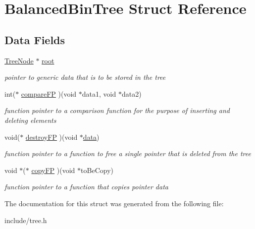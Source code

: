 \hypertarget{struct_balanced_bin_tree}{}\section{Balanced\+Bin\+Tree Struct Reference}
\label{struct_balanced_bin_tree}
\subsection*{Data Fields}
\begin{DoxyCompactItemize}
\item 
\mbox{\label{struct_balanced_bin_tree_a674753c8a07be3804c510c5a2a6e4aa6}} 
\hyperlink{struct_balanced_bin_tree_node}{Tree\+Node} $\ast$ \hyperlink{struct_balanced_bin_tree_a674753c8a07be3804c510c5a2a6e4aa6}{root}
\begin{DoxyCompactList}\small\item\em pointer to generic data that is to be stored in the tree \end{DoxyCompactList}\item 
\mbox{\label{struct_balanced_bin_tree_a37dfa16f7cf2e5877b3270c7274b40d0}} 
int($\ast$ \hyperlink{struct_balanced_bin_tree_a37dfa16f7cf2e5877b3270c7274b40d0}{compare\+FP} )(void $\ast$data1, void $\ast$data2)
\begin{DoxyCompactList}\small\item\em function pointer to a comparison function for the purpose of inserting and deleting elements \end{DoxyCompactList}\item 
\mbox{\label{struct_balanced_bin_tree_a39c48eca2f84ba1988b6bf44bee50fbf}} 
void($\ast$ \hyperlink{struct_balanced_bin_tree_a39c48eca2f84ba1988b6bf44bee50fbf}{destroy\+FP} )(void $\ast$\hyperlink{structdata}{data})
\begin{DoxyCompactList}\small\item\em function pointer to a function to free a single pointer that is deleted from the tree \end{DoxyCompactList}\item 
\mbox{\label{struct_balanced_bin_tree_a2d80391a6034372b053b6a3950c3af6e}} 
void $\ast$($\ast$ \hyperlink{struct_balanced_bin_tree_a2d80391a6034372b053b6a3950c3af6e}{copy\+FP} )(void $\ast$to\+Be\+Copy)
\begin{DoxyCompactList}\small\item\em function pointer to a function that copies pointer data \end{DoxyCompactList}\end{DoxyCompactItemize}


The documentation for this struct was generated from the following file\+:\begin{DoxyCompactItemize}
\item 
include/tree.\+h\end{DoxyCompactItemize}
